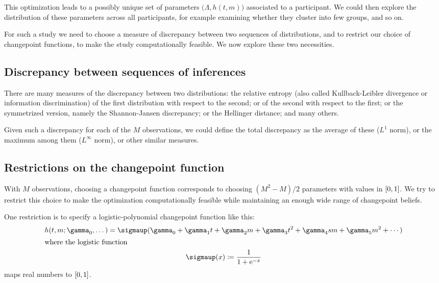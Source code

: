 \documentclass[\ifafour a4paper,12pt,\else a5paper,10pt,\fi%
onecolumn,oneside,article,%
british%
]{memoir}
\theoremstyle{remark}
\theoremstyle{innote}
\newcommand*{\e}{\mathrm{e}}%
\newcommand*{\defd}{\coloneqq}
\DeclarePairedDelimiter\clcl{[}{]}
\renewcommand*{\|}{\mathpunct{|}}
\newcommand*{\yN}{\varLambda}
\newcommand*{\yrs}{h}
\newcommand*{\logistic}{\sigmaup}
\begin{document}
This optimization leads to a possibly unique set of parameters
$\bigl(\yN, \yrs(t,m)\bigr)$ associated to a participant. We could then
explore the distribution of these parameters across all participants, for
example examining whether they cluster into few groups, and so on.

For such a study we need to choose a measure of discrepancy between two
sequences of distributions, and to restrict our choice of changepoint
functions, to make the study computationally feasible. We now explore these
two necessities.

\subsection{Discrepancy between sequences of inferences}
\label{sec:discrepancy_measure}

There are many measures of the discrepancy between two distributions: the
relative entropy (also called Kullback-Leibler divergence or information
discrimination) of the first distribution with respect to the second; or of
the second with respect to the first; or the symmetrized version, namely the
Shannon-Jansen discrepancy; or the Hellinger distance; and many others.

Given such a discrepancy for each of the $M$ observations, we could define
the total discrepancy as the average of these ($L^1$ norm), or the maximum
among them ($L^{\infty}$ norm), or other similar measures.

\subsection{Restrictions on the changepoint function}
\label{sec:restrictions_h}

With $M$ observations, choosing a changepoint function corresponds to
choosing $(M^2-M)/2$ parameters with values in $\clcl{0,1}$. We try to
restrict this choice to make the optimization computationally feasible
while maintaining an enough wide range of changepoint beliefs.

One restriction is to specify a logistic-polynomial changepoint function
like this:
\begin{gather}
  \label{eq:changepoint_logistic_general}
  \yrs(t,m ; \gamma_0,\dotsc) =
  \logistic(\gamma_0 + \gamma_1 t + \gamma_2 m +
  \gamma_3 t^2 + \gamma_4 sm + \gamma_5 m^2 + \dotsb)
  \\
  \shortintertext{where the logistic function}
  \label{eq:logistic_def}
  \logistic(x) \defd \frac{1}{1+\e^{-x}} 
\end{gather}
maps real numbers to $\clcl{0,1}$.
\end{document}
